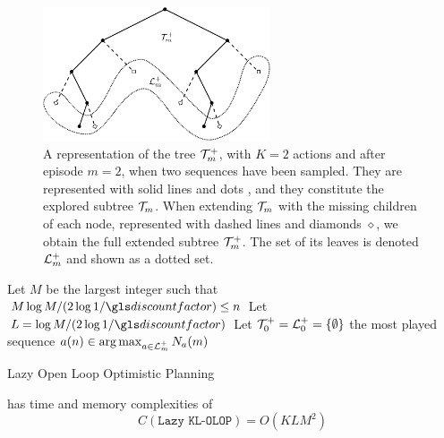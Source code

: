\begin{subappendices}
\begin{figure}[ht]
	\centering
	\includegraphics[width=0.6\textwidth]{img/tree_svg-tex}
	\caption{A representation of the tree $\mathcal{T}_m^+$, with $K = 2$ actions and after episode $m = 2$, when two sequences have been sampled. They are represented with solid lines and dots \textbullet, and they constitute the explored subtree $\mathcal{T}_m$. When extending $\mathcal{T}_m$ with the missing children of each node, represented with dashed lines and diamonds $\diamond$, we obtain the full extended subtree $\mathcal{T}_m^+$. The set of its leaves is denoted $\mathcal{L}_m^+$ and shown as a dotted set.}
	\label{fig:tree}
\end{figure}

\begin{algorithm}[tp]
	\DontPrintSemicolon
	Let $M$ be the largest integer such that $M \log M/(2 \log 1/\discount) \leq n$\;
	Let $L = \log M / (2 \log 1/\discount)$\;
	Let $\mathcal{T}_0^+ = \mathcal{L}_0^+ = \{\emptyset\}$\;
	\Return the most played sequence $a(n) \in \operatorname*{arg\,max}_{a\in \mathcal{L}_m^+} N_a(m)$
	\caption{Lazy Open Loop Optimistic Planning}
	\label{algo:lazy-kl-olop}
\end{algorithm}


\begin{proposition}
	\begin{leftbar}[propositionbar]
		 has time and memory complexities of
		\begin{equation*}
		C(\texttt{Lazy KL-OLOP}) = O(KLM^2)
		\end{equation*}
		

\end{leftbar}
\end{proposition}
\end{subappendices}
